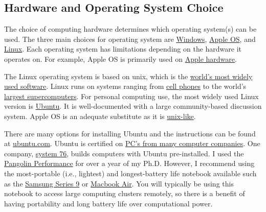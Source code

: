 \subsection{\label{A:Comp_Env:OS}Hardware and Operating System Choice}

The choice of computing hardware determines which operating system(s) 
can be used. The three 
main choices for operating system are 
\href{http://en.wikipedia.org/wiki/Microsoft_Windows}{Windows}, 
\href{http://en.wikipedia.org/wiki/Mac_OS}{Apple OS}, and 
\href{http://en.wikipedia.org/wiki/Linux}{Linux}. Each 
operating system has limitations depending on the hardware it 
operates on.   
For example, Apple OS is primarily used on 
\href{http://en.wikipedia.org/wiki/Macintosh}{Apple hardware}.

The Linux operating system is based on unix, which is the  
\href{http://www.youtube.com/watch?v=7XTHdcmjenI}
{world's most widely used software}. 
Linux runs on systems ranging from 
\href{http://www.pcworld.com/article/250899/mobile_linux_its_not_just_android_anymore.html}
{cell phones} to the world's 
\href{http://www.zdnet.com/20-great-years-of-linux-and-supercomputers-7000018681/}
{largest supercomputers}. For personal computing use, the most widely 
used Linux version is \href{http://www.ubuntu.com/}{Ubuntu}.
It is well-documented with a large community-based discussion 
system. Apple OS is an adequate substitute as it is 
\href{https://en.wikipedia.org/wiki/Unix-like}{unix-like}.

There are many options for installing Ubuntu and the instructions 
can be found at 
\href{http://www.ubuntu.com/}{ubuntu.com}.
Ubuntu is certified on 
\href{http://www.ubuntu.com/certification/}
{PC's from many computer companies}. 
One company, \href{https://www.system76.com/}{system 76}, 
builds computers with Ubuntu pre-installed. I used the 
\href{https://www.system76.com/laptops/model/panp9}
{Pangolin Performance} for over a year of my Ph.D.  However, 
I recommend using the most-portable (i.e., lightest) and 
longest-battery life notebook available such as the 
\href{https://help.ubuntu.com/community/SamsungSeries9}
{Samsung Series 9}  
or \href{https://help.ubuntu.com/community/MacBookAir}{Macbook Air}. 
You will typically be using this notebook to access large computing 
clusters remotely, 
so there is a benefit of having portability and long 
battery life over computational power.  

